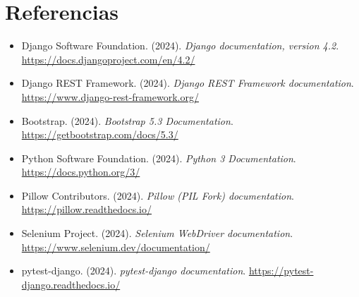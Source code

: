 \documentclass[11pt,letterpaper]{article}
\begin{document}
	\section{Referencias}
	\begin{itemize}[leftmargin=*]
		\item Django Software Foundation. (2024). \emph{Django documentation, version 4.2}. \url{https://docs.djangoproject.com/en/4.2/}
		\item Django REST Framework. (2024). \emph{Django REST Framework documentation}. \url{https://www.django-rest-framework.org/}
		\item Bootstrap. (2024). \emph{Bootstrap 5.3 Documentation}. \url{https://getbootstrap.com/docs/5.3/}
		\item Python Software Foundation. (2024). \emph{Python 3 Documentation}. \url{https://docs.python.org/3/}
		\item Pillow Contributors. (2024). \emph{Pillow (PIL Fork) documentation}. \url{https://pillow.readthedocs.io/}
		\item Selenium Project. (2024). \emph{Selenium WebDriver documentation}. \url{https://www.selenium.dev/documentation/}
		\item pytest-django. (2024). \emph{pytest-django documentation}. \url{https://pytest-django.readthedocs.io/}
	\end{itemize}
	
\end{document}

